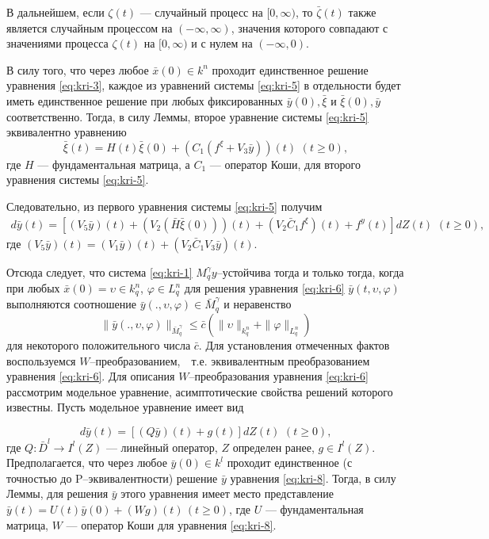 В дальнейшем, если $\zeta (t)$  --- случайный процесс на
$[0,\infty)$, то $\bar \zeta (t)$ также является  случайным
процессом на  $(- \infty , \infty )$, значения которого  совпадают с
значениями процесса $\zeta (t)$ на $[0,\infty)$ и с нулем на
$(-\infty , 0)$.

В силу того, что через любое $\bar x(0) \in k^n$ проходит
единственное решение уравнения \eqref{eq:kri-3}, каждое из уравнений системы \eqref{eq:kri-5}
в отдельности будет иметь единственное решение при любых
фиксированных $\bar y(0), \bar \xi $ и $\bar \xi(0), \bar y$
соответственно. Тогда, в силу Леммы, второе уравнение системы \eqref{eq:kri-5}
эквивалентно уравнению
$$
\bar \xi(t) = H(t)\bar \xi(0) + (C_1(f^\xi + V_3\bar y))(t) {\,\,}
(t \ge 0),
$$
где $H$ --- фундаментальная матрица, а $C_1$ --- оператор Коши, для
второго уравнения системы \eqref{eq:kri-5}.

Следовательно, из первого уравнения системы \eqref{eq:kri-5} получим
\begin{equation}
    \label{eq:kri-6}
    \begin{array}{crl}
    d\bar y(t) = [(V_5\bar y)(t) + (V_2(\bar H\bar \xi(0)))(t)  +
    (V_2\bar C_1f^\xi)(t) + f^y(t)]dZ(t){\,\,} (t \ge 0),
    \end{array}
\end{equation}
где $(V_5\bar y)(t) = (V_1\bar y)(t)+ (V_2\bar C_1V_3\bar y)(t)$.


Отсюда следует, что система \eqref{eq:kri-1} $M_q^\gamma y$--устойчива тогда и
только тогда, когда при любых $\bar x(0) = \upsilon \in k^n_q$,
$\varphi \in L^n_q$ для решения уравнения \eqref{eq:kri-6} $\bar y(t, \upsilon,
\varphi)$ выполняются соотношение $\bar y(., \upsilon, \varphi) \in
\bar M_q^\gamma$ и неравенство
\begin{equation}
\label{eq:kri-7}
\|\bar y(., \upsilon, \varphi)\|_{\bar M_q^\gamma} \le \bar c\left(\|\upsilon\|_{k^n_q} +
 \|\varphi \|_{L^n_q}\right)   
\end{equation}
для некоторого положительного числа $\bar c$. Для установления
отмеченных фактов воспользуемся $W$--преобразованием, {\,\,} т.е.
эквивалентным преобразованием уравнения \eqref{eq:kri-6}. Для описания
$W$--преобразо\-вания уравнения \eqref{eq:kri-6} рассмотрим модельное уравнение,
асимптотические свойства решений которого известны. Пусть модельное
уравнение имеет вид

\begin{equation}
\label{eq:kri-8}
d\bar y(t) = [(Q\bar y)(t) + g(t)]dZ(t) {\,\,} (t \ge 0), 
\end{equation}
где $Q:\bar D^l \rightarrow I^l(Z)$ --- линейный оператор, $Z$
определен ранее, $g \in I^l(Z)$. Предполагается, что через любое
$\bar y(0) \in k^l$ проходит единственное (с точностью до
P--эквивалентности) решение $\bar y$ уравнения \eqref{eq:kri-8}. Тогда, в силу
Леммы, для решения $\bar y$ этого уравнения имеет место
представление $\bar y(t) = U(t)\bar y(0) + (Wg)(t){\,} (t \ge 0)$,
где $U$ --- фундаментальная матрица, $W$ --- оператор Коши для
уравнения \eqref{eq:kri-8}.

